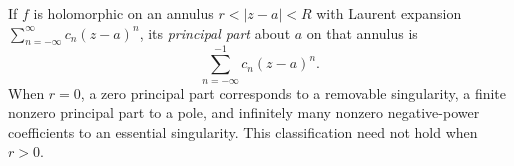 
If $f$ is holomorphic on an annulus $r<|z-a|<R$ with Laurent expansion $\sum_{n=-\infty}^{\infty}c_n(z-a)^n$, its \emph{principal part} about $a$ on that annulus is
\[
\sum_{n=-\infty}^{-1}c_n(z-a)^n.
\]
When $r=0$, a zero principal part corresponds to a removable singularity, a finite nonzero principal part to a pole, and infinitely many nonzero negative-power coefficients to an essential singularity. This classification need not hold when $r>0$.

